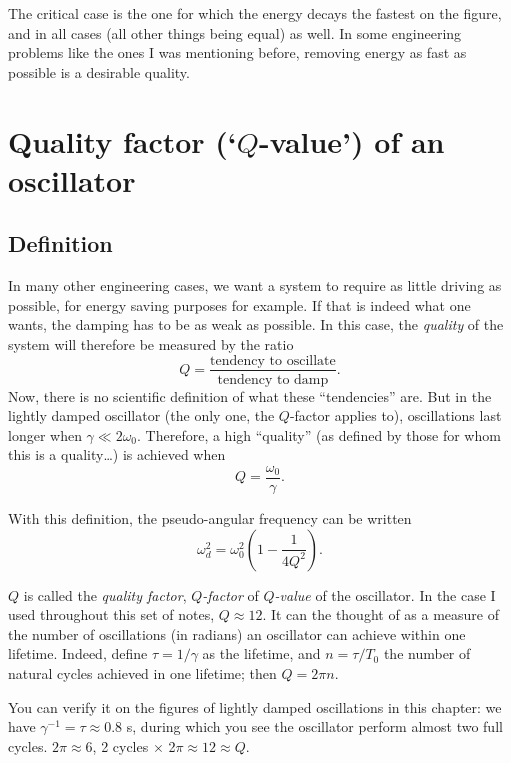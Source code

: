 \documentclass[11pt]{article}
\begin{document}
    The critical case is the one for which the energy decays the fastest on
the figure, and in all cases (all other things being equal) as well. In
some engineering problems like the ones I was mentioning before,
removing energy as fast as possible is a desirable quality.

    \hypertarget{quality-factor-q-value-of-an-oscillator}{%
\section{\texorpdfstring{Quality factor (`\(Q\)-value') of an
oscillator}{Quality factor (`Q-value') of an oscillator}}\label{quality-factor-q-value-of-an-oscillator}}

\hypertarget{definition}{%
\subsection{Definition}\label{definition}}

In many other engineering cases, we want a system to require as little
driving as possible, for energy saving purposes for example. If that is
indeed what one wants, the damping has to be as weak as possible. In
this case, the \emph{quality} of the system will therefore be measured
by the ratio
\[ Q = \frac{\textrm{tendency to oscillate}}{\textrm{tendency to damp}}. \]
Now, there is no scientific definition of what these ``tendencies'' are.
But in the lightly damped oscillator (the only one, the \(Q\)-factor
applies to), oscillations last longer when \(\gamma \ll 2\omega_0\).
Therefore, a high ``quality'' (as defined by those for whom this is a
quality\ldots{}) is achieved when
\[ \boxed{Q = \frac{\omega_0}\gamma}. \]

With this definition, the pseudo-angular frequency can be written
\[\omega_d^2 = \omega_0^2\left(1 - \frac1{4Q^2}\right).\]

\(Q\) is called the \emph{quality factor}, \(Q\)\emph{-factor} of
\(Q\)\emph{-value} of the oscillator. In the case I used throughout this
set of notes, \(Q \approx 12\). It can the thought of as a measure of
the number of oscillations (in radians) an oscillator can achieve within
one lifetime. Indeed, define \(\tau = 1/\gamma\) as the lifetime, and
\(n = \tau/T_0\) the number of natural cycles achieved in one lifetime;
then \(Q = 2\pi n\).

    You can verify it on the figures of lightly damped oscillations in this
chapter: we have \(\gamma^{-1} = \tau \approx 0.8\) s, during which you
see the oscillator perform almost two full cycles. \(2\pi \approx 6\), 2
cycles \(\times\) 2\(\pi \approx 12\approx Q\).
\end{document}
